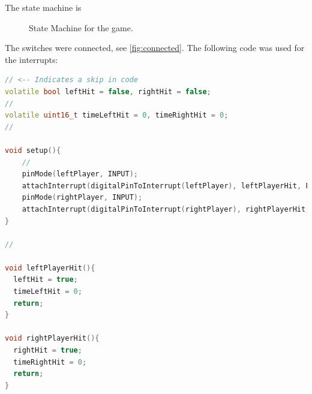 
\begin{arabicparts}
    \questionpart The state machine is

    \begin{figure}[ht]
        \centering
        \caption{State Machine for the game.}
        \label{fig:statemach}
    \end{figure}
    
    The switches were connected, see \autoref{fig:connected}. The
    following code was used for the interrupts:

    \begin{lstlisting}[language=C++]
// <-- Indicates a skip in code
volatile bool leftHit = false, rightHit = false;
//
volatile uint16_t timeLeftHit = 0, timeRightHit = 0;
// 

void setup(){
    //
    pinMode(leftPlayer, INPUT);
    attachInterrupt(digitalPinToInterrupt(leftPlayer), leftPlayerHit, FALLING);
    pinMode(rightPlayer, INPUT);
    attachInterrupt(digitalPinToInterrupt(rightPlayer), rightPlayerHit, FALLING);
}

// 

void leftPlayerHit(){
  leftHit = true;
  timeLeftHit = 0;
  return;
}

void rightPlayerHit(){
  rightHit = true;
  timeRightHit = 0;
  return;
}
    \end{lstlisting}
    

\end{arabicparts}
